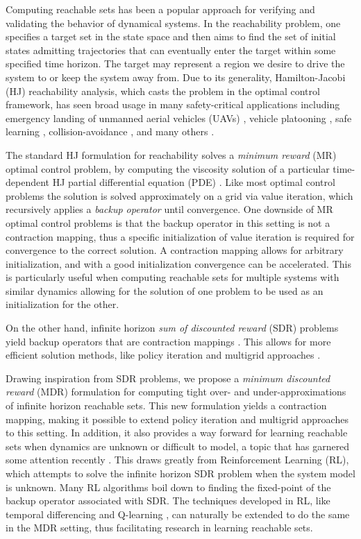 
Computing reachable sets has been a popular approach for verifying and validating the behavior of dynamical systems. In the reachability problem, one specifies a target set in the state space and then aims to find the set of initial states admitting trajectories that can eventually enter the target within some specified time horizon. The target may represent a region we desire to drive the system to or keep the system away from. Due to its generality, Hamilton-Jacobi (HJ) reachability analysis, which casts the problem in the optimal control framework, has seen broad usage in many safety-critical applications including emergency landing of unmanned aerial vehicles (UAVs) \cite{Ding2016}, vehicle platooning \cite{Chen2015a}, safe learning \cite{Akametalu2014, Gillula2012}, collision-avoidance \cite{Hoffmann2008, Mitchell2005}, and many others \cite{Ding2011a, Huang2011}.


The standard HJ formulation for reachability solves a \emph{minimum reward} (MR) optimal control problem, by computing the viscosity solution of a particular time-dependent HJ partial differential equation (PDE) \cite{Mitchell2005}. Like most optimal control problems the solution is solved approximately on a grid via value iteration, which recursively applies a \emph{backup operator} until convergence. One downside of MR optimal control problems is that the backup operator in this setting is not a contraction mapping, thus a specific initialization of value iteration is required for convergence to the correct solution. A contraction mapping allows for arbitrary initialization, and with a good initialization convergence can be accelerated. This is particularly useful when computing reachable sets for multiple systems with similar dynamics allowing for the solution of one problem to be used as an initialization for the other.

On the other hand, infinite horizon \emph{sum of discounted reward} (SDR) problems yield backup operators that are contraction mappings \cite{Bertsekas1995}. This allows for more efficient solution methods, like policy iteration \cite{Howard1964, Puterman1979} and multigrid approaches \cite{Alla2015, Chow1991}.   
 
Drawing inspiration from SDR problems, we propose a \emph{minimum discounted reward} (MDR) formulation for computing tight over- and under-approximations of infinite horizon reachable sets. This new formulation yields a contraction mapping, making it possible to extend policy iteration and multigrid approaches to this setting. In addition, it also provides a way forward for learning reachable sets when dynamics are unknown or difficult to model, a topic that has garnered some attention recently \cite{Akametalu2015,Djeridane2006}. This draws greatly from Reinforcement Learning (RL), which attempts to solve the infinite horizon SDR problem when the system model is unknown. Many RL algorithms boil down to finding the fixed-point of the backup operator associated with SDR. The techniques developed in RL, like temporal differencing \cite{Sutton1988} and Q-learning \cite{Watkins1992}, can naturally be extended to do the same in the MDR setting, thus facilitating research in learning reachable sets.

